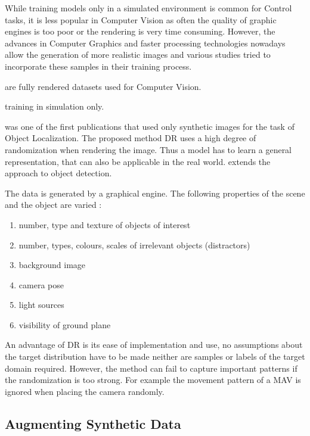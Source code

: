 \cite{Sadeghi2016,Hinterstoisser2017,Krizhevsky2012a}

While training models only in a simulated environment is common for Control tasks, it is less popular in Computer Vision as often the quality of graphic engines is too poor or the rendering is very time consuming. However, the advances in Computer Graphics and faster processing technologies nowadays allow the generation of more realistic images and various studies tried to incorporate these samples in their training process.

\cite{Ros2016, Gaidon2016} are fully rendered datasets used for Computer Vision. 

\cite{Johnson-Roberson2016} training in simulation only.

\cite{Tobin2017} was one of the first publications that used only synthetic images for the task of Object Localization. The proposed method \ac{DR} uses a high degree of randomization when rendering the image. Thus a model has to learn a general representation, that can also be applicable in the real world. \cite{Tremblay2018a} extends the approach to object detection.

The data is generated by a graphical engine. The following properties of the scene and the object are varied \cite{Tremblay2018a}:

\begin{enumerate}
	\item number, type and texture of objects of interest
	\item number, types, colours, scales of irrelevant objects (distractors)
	\item background image
	\item camera pose
	\item light sources
	\item visibility of ground plane
\end{enumerate}

An advantage of \ac{DR} is its ease of implementation and use, no assumptions about the target distribution have to be made neither are samples or labels of the target domain required. However, the method can fail to capture important patterns if the randomization is too strong. For example the movement pattern of a \ac{MAV} is ignored when placing the camera randomly.


\subsection{Augmenting Synthetic Data}


